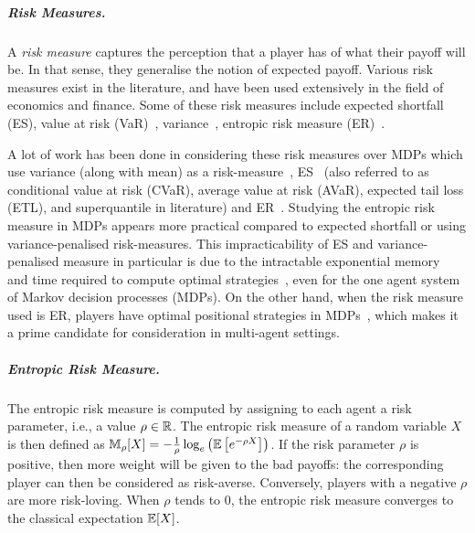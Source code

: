 \subparagraph*{Risk Measures.}
A \emph{risk measure} captures the perception that a player has of what their payoff will be. In that sense, they generalise the notion of expected payoff.
Various risk measures exist in the literature, and have been used extensively in the field of economics and finance. 
Some of these risk measures include expected shortfall (ES), value at risk (VaR)~\cite{Aue18}, variance~\cite{Bra99}, entropic risk measure (ER)~\cite{FS02}. 

A lot of work has been done in considering these risk measures over MDPs which use variance (along with mean) as a risk-measure~\cite{FK89, PSB22,MT11}, ES~\cite{RRS15,KM18,Meg22} (also referred to as conditional value at risk (CVaR), average value at risk (AVaR), expected tail loss (ETL), and superquantile in literature) and ER~\cite{HM72,BR14,BCMP24}. %
Studying the entropic risk measure in MDPs appears more practical compared to expected shortfall  or using variance-penalised risk-measures. This impracticability of ES and variance-penalised measure in particular is due to the intractable exponential memory~\cite{HK15} and time required to compute optimal strategies~\cite{PSB22}, even for the one agent system of Markov decision processes (MDPs). On the other hand, when the risk measure used is ER, players have optimal positional strategies in MDPs~\cite{How72}, which makes it a prime candidate for consideration in multi-agent settings.

\subparagraph*{Entropic Risk Measure.}
The entropic risk measure is computed by assigning to each agent a risk parameter, i.e., a value $\rho \in \mathbb{R}$.
The entropic risk measure of a random variable $X$ is then defined as
$\mathbb{M}_\rho[X] = -\frac{1}{\rho} \log_e \left( \mathbb{E} \left[ e^{-\rho X}\right] \right)$. 
If the risk parameter $\rho$ is positive, then more weight will be given to the bad payoffs: the corresponding player can then be considered as risk-averse.
Conversely, players with a negative $\rho$ are more risk-loving.
When $\rho$ tends to $0$, the entropic risk measure converges to the classical expectation $\mathbb{E}[X]$.

